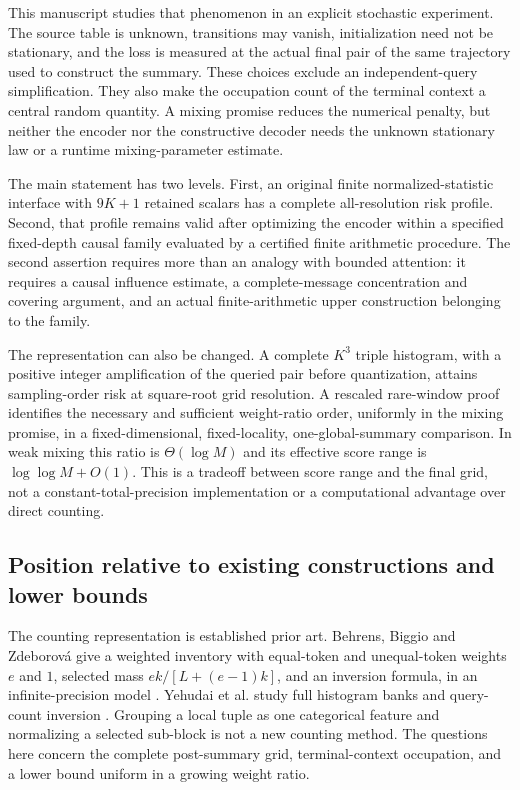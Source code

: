 \documentclass[11pt,letterpaper]{article}
\theoremstyle{definition}\newtheorem{definition}[theorem]{Definition}
\theoremstyle{remark}\newtheorem{remark}[theorem]{Remark}
\begin{document}
This manuscript studies that phenomenon in an explicit stochastic experiment. The source table is unknown, transitions may vanish, initialization need not be stationary, and the loss is measured at the actual final pair of the same trajectory used to construct the summary. These choices exclude an independent-query simplification. They also make the occupation count of the terminal context a central random quantity. A mixing promise reduces the numerical penalty, but neither the encoder nor the constructive decoder needs the unknown stationary law or a runtime mixing-parameter estimate.

The main statement has two levels. First, an original finite normalized-statistic interface with $9K+1$ retained scalars has a complete all-resolution risk profile. Second, that profile remains valid after optimizing the encoder within a specified fixed-depth causal family evaluated by a certified finite arithmetic procedure. The second assertion requires more than an analogy with bounded attention: it requires a causal influence estimate, a complete-message concentration and covering argument, and an actual finite-arithmetic upper construction belonging to the family.

The representation can also be changed. A complete $K^3$ triple histogram, with a positive integer amplification of the queried pair before quantization, attains sampling-order risk at square-root grid resolution. A rescaled rare-window proof identifies the necessary and sufficient weight-ratio order, uniformly in the mixing promise, in a fixed-dimensional, fixed-locality, one-global-summary comparison. In weak mixing this ratio is $\Theta(\log M)$ and its effective score range is $\log\log M+O(1)$. This is a tradeoff between score range and the final grid, not a constant-total-precision implementation or a computational advantage over direct counting.

\subsection{Position relative to existing constructions and lower bounds}
The counting representation is established prior art. Behrens, Biggio and Zdeborov\'a give a weighted inventory with equal-token and unequal-token weights $e$ and $1$, selected mass $ek/[L+(e-1)k]$, and an inversion formula, in an infinite-precision model \citep[Appendix B.3]{behrens2025}. Yehudai et al. study full histogram banks and query-count inversion \citep[Sections 4.1--4.2]{yehudai2026}. Grouping a local tuple as one categorical feature and normalizing a selected sub-block is not a new counting method. The questions here concern the complete post-summary grid, terminal-context occupation, and a lower bound uniform in a growing weight ratio.
\end{document}
